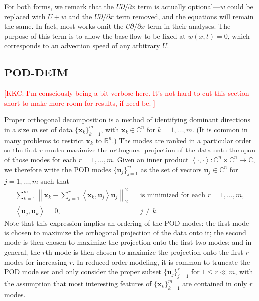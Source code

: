 \documentclass[11pt]{article}
\newcommand*{\Complex}{\mathbb{C}}
\newcommand*{\Reals}{\mathbb{R}}
\newcommand*{\ip}[2]{\left<#1, #2\right>}
\renewcommand*{\u}{\mathbf{u}}
\newcommand*{\x}{\mathbf{x}}
\newcommand{\kkc}[1]{\textcolor{red}{[KKC: #1]}}
\begin{document}
For both forms, we remark that the $U \partial / \partial x$ term is actually optional---$w$ could be replaced with $U + w$ and the $U \partial / \partial x$ term removed, and the equations will remain the same.
In fact, most works omit the $U \partial / \partial x$ term in their analyses.
The purpose of this term is to allow the base flow to be fixed at $w(x, t) = 0$, which corresponds to an advection speed of any arbitrary $U$.

\subsection{POD-DEIM}

\kkc{%
    I'm consciously being a bit verbose here.
    It's not hard to cut this section short to make more room for results, if need be.%
}

Proper orthogonal decomposition \citep{SirovichQAM87, HolmesTCSDSS} is a method of identifying dominant directions in a size $m$ set of data $\{\x_k\}_{k=1}^m$, with $\x_k \in \Complex^n$ for $k = 1, \ldots, m$.
(It is common in many problems to restrict $\x_k$ to $\Reals^n$.)
The modes are ranked in a particular order so the first $r$ modes maximize the orthogonal projection of the data onto the span of those modes for each $r = 1, \ldots, m$.
Given an inner product $\ip{\cdot}{\cdot} : \Complex^n \times \Complex^n \to \Complex$, we therefore write the POD modes $\{\u_j\}_{j=1}^m$ as the set of vectors $\u_j \in \Complex^n$ for $j = 1, \ldots, m$ such that
\begin{subequations}
    \begin{align}
        \sum_{k=1}^m \left\|\x_k - \sum_{j=1}^r \ip{\x_k}{\u_j} \u_j \right\|_2^2 \quad & \text{is minimized for each } r = 1, \ldots, m, \\
        \ip{\u_j}{\u_k} = 0, \quad & j \ne k.
    \end{align}
\end{subequations}
Note that this expression implies an ordering of the POD modes: the first mode is chosen to maximize the orthogonal projection of the data onto it; the second mode is then chosen to maximize the projection onto the first two modes; and in general, the $r$th mode is then chosen to maximize the projection onto the first $r$ modes for increasing $r$.
In reduced-order modeling, it is common to truncate the POD mode set and only consider the proper subset $\{\u_j\}_{j=1}^r$ for $1 \le r \ll m$, with the assumption that most interesting features of $\{\x_k\}_{k=1}^m$ are contained in only $r$ modes.
\end{document}
